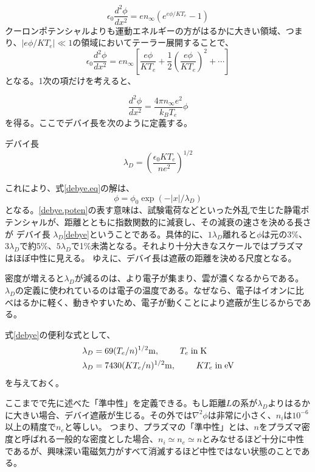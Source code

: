 \documentclass{ltjsarticle}
\numberwithin{equation}{section} %
\begin{document}
\[
\epsilon_0 \frac{d^2\phi}{dx^2}= en_\infty(e^{e\phi/KT_e} - 1)
\]
クーロンポテンシャルよりも運動エネルギーの方がはるかに大きい領域、つまり、$|e\phi / KT_e| \ll 1$の領域においてテーラー展開することで、
\[
 \epsilon_0 \frac{d^2\phi}{dx^2} = en_\infty\left[\frac{e\phi}{KT_e}+ \frac{1}{2}(\frac{e\phi}{KT_e})^2 + \cdots \right] \label{telor.1}
\]
となる。1次の項だけを考えると、

\begin{equation}
  \frac{d^2 \phi}{dx^2} = \frac{4\pi n_\infty e^2}{k_B T_e}\phi \label{debye.eq}
\end{equation}
を得る。ここでデバイ長を次のように定義する。

\begin{eqbox}{デバイ長}
\begin{equation}
 \lambda_D = \left(\dfrac{\epsilon_0 KT_e}{ne^2}\right)^{1/2} \label{debye}
\end{equation}
\end{eqbox}
これにより、式\eqref{debye.eq}の解は、
\begin{equation}
  \phi = \phi_0 \exp(-|x|/\lambda_D) \label{debye.poten}
\end{equation}
となる。\eqref{debye.poten}の表す意味は、試験電荷などといった外乱で生じた静電ポテンシャルが、距離とともに指数関数的に減衰し、その減衰の速さを決める長さが デバイ長 
$\lambda_D$\eqref{debye}ということである。具体的に、$1\lambda_D$離れると$\phi$は元の3\%、$3\lambda_D$で約5\%、$5\lambda_D$で1\%未満となる。それより十分大きなスケールではプラズマはほぼ中性に見える。
ゆえに、デバイ長は遮蔽の距離を決める尺度となる。

密度が増えると$\lambda_D$が減るのは、より電子が集まり、雲が濃くなるからである。$\lambda_D$の定義に使われているのは電子の温度である。なぜなら、電子はイオンに比べはるかに軽く、動きやすいため、電子が動くことにより遮蔽が生じるからである。

式\eqref{debye}の便利な式として、
\begin{align}
  \begin{split}
    \lambda_D &= 69(T_e/n)^{1/2}\si{\metre}, \hspace{2pc}  T_e \; \text{in} \; \si{\kelvin}\\
    \lambda_D &= 7430(KT_e/n)^{1/2}\si{\metre}, \hspace{2pc} KT_e \; \text{in} \; \si{\electronvolt}
  \end{split}
\end{align}
を与えておく。

ここまでで先に述べた「準中性」を定義できる。もし距離$L$の系が$\lambda_D$よりはるかに大きい場合、デバイ遮蔽が生じる。その外では$\nabla^2 \phi$は非常に小さく、$n_i$は$10^{-6}$以上の精度で$n_e$と等しい。
つまり、プラズマの「準中性」とは、$n$をプラズマ密度と呼ばれる一般的な密度とした場合、$n_i \simeq n_e \simeq n$とみなせるほど十分に中性であるが、興味深い電磁気力がすべて消滅するほど中性ではない状態のことである。 
\end{document}

